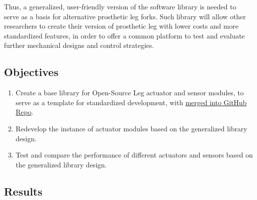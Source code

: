 \documentclass[12pt]{article}
\begin{document}
Thus, a generalized, user-friendly version of the software library is needed to serve as a basis for alternative prosthetic leg forks. Such library will allow other researchers to create their version of prosthetic leg with lower costs and more standardized features, in order to offer a common platform to test and evaluate further mechanical designs and control strategies.


\subsection{Objectives}

\begin{enumerate}
    \item {Create a base library for Open-Source Leg actuator and sensor modules, to serve as a template for standardized development, with \href{https://github.com/neurobionics/opensourceleg}{merged into GitHub Repo}.}
    \item {Redevelop the instance of actuator modules based on the generalized library design.}
    \item {Test and compare the performance of different actuators and sensors based on the generalized library design.}
\end{enumerate}

\subsection{Results}
\end{document}
